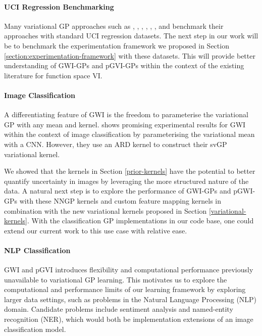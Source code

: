 \documentclass{article}
\numberwithin{equation}{section}
\begin{document}
\paragraph{UCI Regression Benchmarking} 
Many variational GP approaches such as \cite{wild2022generalized}, \cite{blundell2015weight}, \cite{gal2015dropout}, \cite{li2017dropout}, \cite{ma2021functional}, \cite{ma2019variational}, and \cite{sun2019functional} benchmark their approaches with standard UCI regression datasets. 
The next step in our work will be to benchmark the experimentation framework we proposed in Section \ref{section:experimentation-framework} with these datasets.
This will provide better understanding of GWI-GPs and pGVI-GPs within the context of the existing literature for function space VI.


\paragraph{Image Classification} 
A differentiating feature of GWI is the freedom to parameterise the variational GP with any mean and kernel. 
\cite{wild2022generalized} shows promising experimental results for GWI within the context of image classification by parameterising the variational mean with a CNN.
However, they use an ARD kernel to construct their svGP variational kernel.

We showed that the kernels in Section \ref{prior-kernels} have the potential to better quantify uncertainty in images by leveraging the more structured nature of the data.
A natural next step is to explore the performance of GWI-GPs and pGWI-GPs with these NNGP kernels and custom feature mapping kernels in combination with the new variational kernels proposed in Section \ref{variational-kernels}.
With the classification GP implementations in our code base, one could extend our current work to this use case with relative ease.

\paragraph{NLP Classification} GWI and pGVI introduces flexibility and computational performance previously unavailable to variational GP learning. 
This motivates us to explore the computational and performance limits of our learning framework by exploring larger data settings, such as problems in the Natural Language Processing (NLP) domain.
Candidate problems include sentiment analysis and named-entity recognition (NER), which would both be implementation extensions of an image classification model.
\end{document}
